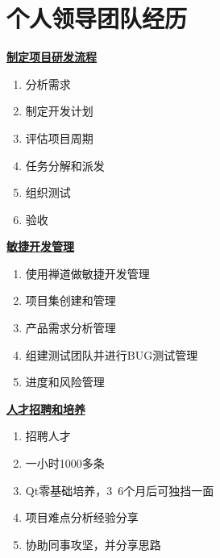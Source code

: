 \documentclass[lighthipster]{simplehipstercv}
\begin{document}
	\clearpage
	
	\begin{minipage}[t]{\textwidth}
		\section*{个人领导团队经历}
		
		\begin{minipage}[t]{\textwidth}
			\begin{minipage}[thbp]{0.3\textwidth}
				\textbf{\underline{制定项目研发流程}}
				\begin{enumerate}
					\item 分析需求
					\item 制定开发计划
					\item 评估项目周期
					\item 任务分解和派发
					\item 组织测试
					\item 验收
				\end{enumerate}
			\end{minipage} \hfill
			\begin{minipage}[thbp]{0.3\textwidth}
			\textbf{\underline{敏捷开发管理}}
			\begin{enumerate}
				\item 使用禅道做敏捷开发管理
				\item 项目集创建和管理
				\item 产品需求分析管理
				\item 组建测试团队并进行BUG测试管理
				\item 进度和风险管理
			\end{enumerate}
			\end{minipage} \hfill
			\begin{minipage}[thbp]{0.3\textwidth}
			\textbf{\underline{人才招聘和培养}}
			\begin{enumerate}
				\item 招聘人才
				\item 一小时1000多条
				\item Qt零基础培养，3~6个月后可独挡一面
				\item 项目难点分析经验分享
				\item 协助同事攻坚，并分享思路
			\end{enumerate}
			\end{minipage}
			\bigskip
		\end{minipage}
	\end{minipage}
	
	\vspace{3em}
	
\end{document}
